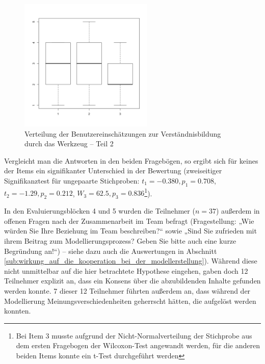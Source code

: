 \begin{figure}[htbp]
	\centering
		\includegraphics[height=2.5in]{img/Evaluierung/verstaendnis2.png}
	\caption{Verteilung der Benutzereinschätzungen zur Verständnisbildung durch das Werkzeug -- Teil 2}
	\label{fig:img_Evaluierung_verständnis2}
\end{figure}

Vergleicht man die Antworten in den beiden Fragebögen, so ergibt sich für keines der Items ein signifikanter Unterschied in der Bewertung (zweiseitiger Signifikanztest für ungepaarte Stichproben: $t_{1}=-0.380, p_{1}=0.708$, $t_{2}=-1.29, p_{2}=0.212$, $W_{3}=62.5, p_{3}=0.836$\footnote{Bei Item 3 musste aufgrund der Nicht-Normalverteilung der Stichprobe aus dem ersten Fragebogen der Wilcoxon-Test angewandt werden, für die anderen beiden Items konnte ein t-Test durchgeführt werden}).

In den Evaluierungsblöcken 4 und 5 wurden die Teilnehmer ($n=37$) außerdem in offenen Fragen nach der Zusammenarbeit im Team befragt (Fragestellung: „Wie würden Sie Ihre Beziehung im Team beschreiben?“ sowie „Sind Sie zufrieden mit ihrem Beitrag zum Modellierungsprozess? Geben Sie bitte auch eine kurze Begründung an!“) -- siehe dazu auch die Auswertungen in Abschnitt \ref{sub:wirkung_auf_die_kooperation_bei_der_modellerstellung}). Während diese nicht unmittelbar auf die hier betrachtete Hypothese eingehen, gaben doch 12 Teilnehmer explizit an, dass ein Konsens über die abzubildenden Inhalte gefunden werden konnte. 7 dieser 12 Teilnehmer führten außerdem an, dass während der Modellierung Meinungsverschiedenheiten geherrscht hätten, die aufgelöst werden konnten.

